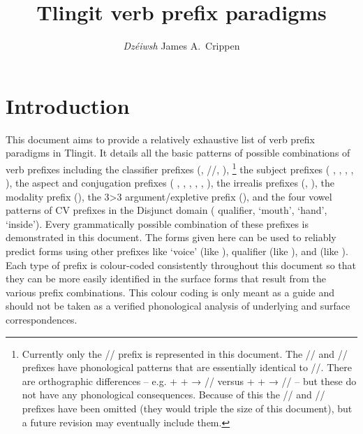 \documentclass[12pt,letterpaper,landscape,oneside,article]{memoir}
\begin{document}
\pagestyle{mine}

\title{Tlingit verb prefix paradigms}
\author{\textit{Dzéiwsh} James A.\ Crippen}
\maketitle

\begin{KeepFromToc}
\tableofcontents
\end{KeepFromToc}

\section{Introduction}

\begin{multicols}{2}
\noindent
This document aims to provide a relatively exhaustive list of verb prefix paradigms in Tlingit.
It details all the basic patterns of possible combinations of verb prefixes including
the classifier prefixes (, //, ),%
\footnote{Currently only the  // prefix is represented in this document.
	The  // and  // prefixes have phonological patterns that are essentially identical to  //.
	There are orthographic differences –
		e.g.{}
		 +  +  →  // 
		versus
		 +  +  →  //
	– but these do not have any phonological consequences.
	Because of this the  // and  // prefixes have been omitted (they would triple the size of this document), but a future revision may eventually include them.}
the subject prefixes ( ,  ,  ,  ,  ),
the aspect and conjugation prefixes ( ,  ,  ,  ,  ,  ),
the irrealis prefixes (, ),
the modality prefix (),
the 3>3 argument/expletive prefix (),
and the four vowel patterns of CV prefixes in the Disjunct domain ( qualifier,  ‘mouth’,  ‘hand’,  ‘inside’).
Every grammatically possible combination of these prefixes is demonstrated in this document.
The forms given here can be used to reliably predict forms using other prefixes like  ‘voice’ (like ),  qualifier (like ), and   (like ).
Each type of prefix is colour-coded consistently throughout this document so that they can be more easily identified in the surface forms that result from the various prefix combinations.
This colour coding is only meant as a guide and should not be taken as a verified phonological analysis of underlying and surface correspondences.


\end{multicols}
\end{document}
